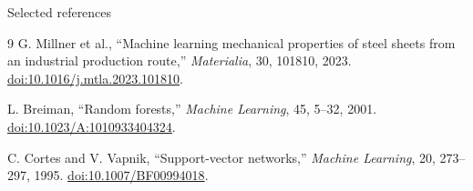 \documentclass[aspectratio=169]{beamer}
\begin{document}
\begin{frame}{Selected references}
  \footnotesize
  \begin{thebibliography}{9}
    G. Millner et al., ``Machine learning mechanical properties of steel sheets from an industrial production route,'' \emph{Materialia}, 30, 101810, 2023.
    \href{https://doi.org/10.1016/j.mtla.2023.101810}{doi:10.1016/j.mtla.2023.101810}.

    L. Breiman, ``Random forests,'' \emph{Machine Learning}, 45, 5--32, 2001.
    \href{https://doi.org/10.1023/A:1010933404324}{doi:10.1023/A:1010933404324}.

    C. Cortes and V. Vapnik, ``Support-vector networks,'' \emph{Machine Learning}, 20, 273--297, 1995.
    \href{https://doi.org/10.1007/BF00994018}{doi:10.1007/BF00994018}.
  \end{thebibliography}
\end{frame}
\end{document}
